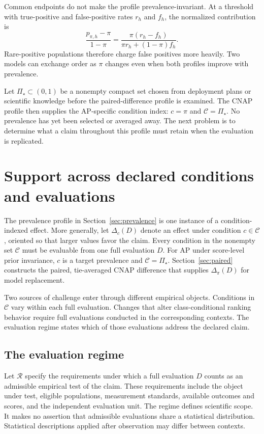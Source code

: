 \documentclass[11pt]{article}
\newcommand{\Regime}{\mathcal{R}}
\newcommand{\CSet}{\mathcal{C}}
\newcommand{\PSet}{\Pi_\star}
\theoremstyle{remark}
\begin{document}
Common endpoints do not make the profile prevalence-invariant. At a threshold with true-positive and false-positive rates $r_h$ and $f_h$, the normalized contribution is
\begin{equation}
\frac{p_{\pi,h}-\pi}{1-\pi}
=
\frac{\pi(r_h-f_h)}
{\pi r_h+(1-\pi)f_h}.
\label{eq:threshold-cnap}
\end{equation}
Rare-positive populations therefore charge false positives more heavily. Two models can exchange order as $\pi$ changes even when both profiles improve with prevalence.

Let $\PSet\subset(0,1)$ be a nonempty compact set chosen from deployment plans or scientific knowledge before the paired-difference profile is examined. The CNAP profile then supplies the AP-specific condition index: $c=\pi$ and $\CSet=\PSet$. No prevalence has yet been selected or averaged away. The next problem is to determine what a claim throughout this profile must retain when the evaluation is replicated.

\section{Support across declared conditions and evaluations}
\label{sec:support}

The prevalence profile in Section~\ref{sec:prevalence} is one instance of a condition-indexed effect. More generally, let $\Delta_c(D)$ denote an effect under condition $c\in\CSet$, oriented so that larger values favor the claim. Every condition in the nonempty set $\CSet$ must be evaluable from one full evaluation $D$. For AP under score-level prior invariance, $c$ is a target prevalence and $\CSet=\PSet$. Section~\ref{sec:paired} constructs the paired, tie-averaged CNAP difference that supplies $\Delta_\pi(D)$ for model replacement.

Two sources of challenge enter through different empirical objects. Conditions in $\CSet$ vary within each full evaluation. Changes that alter class-conditional ranking behavior require full evaluations conducted in the corresponding contexts. The evaluation regime states which of those evaluations address the declared claim.

\subsection{The evaluation regime}

Let $\Regime$ specify the requirements under which a full evaluation $D$ counts as an admissible empirical test of the claim. These requirements include the object under test, eligible populations, measurement standards, available outcomes and scores, and the independent evaluation unit. The regime defines scientific scope. It makes no assertion that admissible evaluations share a statistical distribution. Statistical descriptions applied after observation may differ between contexts.
\end{document}

